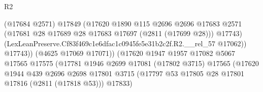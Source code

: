 \begin{lexlean}{R2}
\begin{coremodule}
                                              (@17684 @2571)
                                              @17849
                                              (@17620
                                                @1890
                                                @115
                                                @2696
                                                @2696
                                                @17683
                                                @2571
                                                (@17681
                                                  @28
                                                  @17689
                                                  @28
                                                  @17683
                                                  @17697
                                                  (@2811 (@17699 @28)))
                                                @17743)
                                              (LexLeanPreserve.Cf83f469c1e6dfac1c0945fe5e31b2c2f.R2.__rel_57
                                                @17062))
                                            @17743))
                                        (@4625 @17069 @17071))
                                      (@17620
                                        @1947
                                        @1957
                                        @17082
                                        @5067
                                        @17565
                                        @17575
                                        (@17781
                                          @1946
                                          @2699
                                          @17081
                                          (@17802 @3715)
                                          @17565
                                          (@17620
                                            @1944
                                            @439
                                            @2696
                                            @2698
                                            @17801
                                            @3715
                                            (@17797
                                              @53
                                              @17805
                                              @28
                                              @17801
                                              @17816
                                              (@2811 (@17818 @53)))
                                            @17833)

\end{coremodule}
\end{lexlean}
